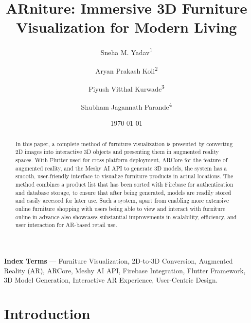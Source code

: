 \documentclass[12pt, a4paper]{article}
\title{ARniture: Immersive 3D Furniture Visualization for Modern Living}
\author{Sneha M. Yadav\textsuperscript{1} \and Aryan Prakash Koli\textsuperscript{2} \and Piyush Vitthal Kurwade\textsuperscript{3} \and Shubham Jagannath Parande\textsuperscript{4}}
\date{\today}
\begin{document}
\maketitle
{}

\begin{abstract}
In this paper, a complete method of furniture visualization is presented by converting 2D images into interactive 3D objects and presenting them in augmented reality spaces. With Flutter used for cross-platform deployment, ARCore for the feature of augmented reality, and the Meshy AI API to generate 3D models, the system has a smooth, user-friendly interface to visualize furniture products in actual locations. The method combines a product list that has been sorted with Firebase for authentication and database storage, to ensure that after being generated, models are readily stored and easily accessed for later use. Such a system, apart from enabling more extensive online furniture shopping with users being able to view and interact with furniture online in advance also showcases substantial improvements in scalability, efficiency, and user interaction for AR-based retail use.
\end{abstract}

\noindent\textbf{Index Terms} --- Furniture Visualization, 2D-to-3D Conversion, Augmented Reality (AR), ARCore, Meshy AI API, Firebase Integration, Flutter Framework, 3D Model Generation, Interactive AR Experience, User-Centric Design.

\section{Introduction}
\end{document}
